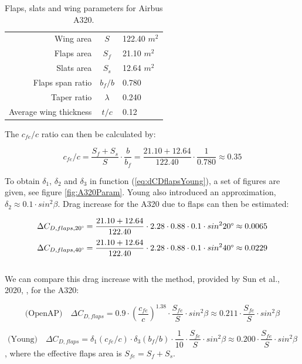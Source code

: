 \documentclass[english]{kththesis}
\begin{document}
\begin{table}[h!]
\centering
\caption{Flaps, slats and wing parameters for Airbus A320.}
\begin{tabular}{ r c l } 
\hline
Wing area & $S$ & 122.40 $m^2$\\
Flaps area & $S_f$ & 21.10 $m^2$\\
Slats area  & $S_s$ & 12.64 $m^2$\\
Flaps span ratio & $b_f/b$ & 0.780\\
Taper ratio & $\lambda$ & 0.240\\
Average wing thickness & $t/c$ & 0.12\\
\hline
\end{tabular}
\label{table:FlapsParam}
\end{table}

The $c_{fe}/c$ ratio can then be calculated by:

$$c_{fe}/c = \frac{S_f + S_s}{S} \cdot \frac{b}{b_f} = \frac{21.10 + 12.64}{122.40} \cdot \frac{1}{0.780} \approx 0.35$$

To obtain $\delta_1$, $\delta_2$ and $\delta_3$ in function (\ref{eq:dCDflapsYoung}), a set of figures are given, see figure \ref{fig:A320Param}. Young \cite{Young1947} also introduced an approximation, $\delta_2 \approx 0.1 \cdot sin^2 \beta$. Drag increase for the A320 due to flaps can then be estimated:

$$\Delta C_{D,flaps,20\degree} = \frac{21.10 + 12.64}{122.40} \cdot 2.28 \cdot 0.88 \cdot 0.1 \cdot sin^2 20\degree \approx 0.0065$$
$$\Delta C_{D,flaps,40\degree} = \frac{21.10 + 12.64}{122.40} \cdot 2.28 \cdot 0.88 \cdot 0.1 \cdot sin^2 40\degree \approx 0.0229$$\\

We can compare this drag increase with the method, provided by Sun et al., 2020, \cite{Sun2020}, for the A320:

\begin{equation}
\label{eq:CDflapsOpenAP}
\text{(OpenAP)} \quad \Delta C_{D,flaps} = 0.9 \cdot \left(\frac{c_{fe}}{c}\right)^{1.38} \cdot \frac{S_{fe}}{S} \cdot sin^2 \beta \approx 0.211 \cdot \frac{S_{fe}}{S} \cdot sin^2 \beta
\end{equation}

\begin{equation}
\label{eq:CDflapsYoung}
\text{(Young)} \quad \Delta C_{D,flaps} = \delta_1(c_{fe}/c)\cdot \delta_3(b_f/b) \cdot \frac{1}{10}\cdot\frac{S_{fe}}{S} \cdot sin^2 \beta \approx 0.200\cdot\frac{S_{fe}}{S} \cdot sin^2 \beta
\end{equation}
, where the effective flaps area is $S_{fe} = S_f+S_s$.
\end{document}

